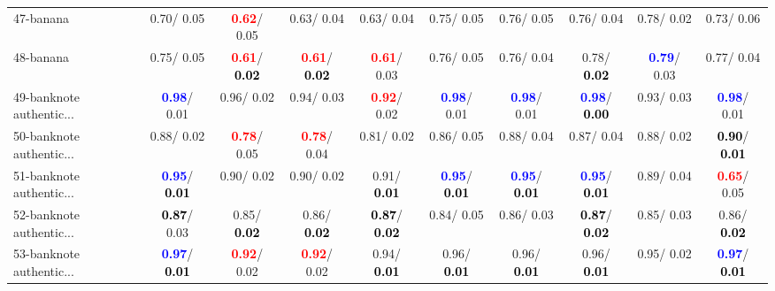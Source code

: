 \begin{table}[h]
\begin{center}
{\begin{tabular}{lc|c|c|c|c|c|c|c|c}
47-banana &   0.70/  0.05 & \textcolor{red}{\textbf{  0.62}}/  0.05 &   0.63/  0.04 &   0.63/  0.04 &   0.75/  0.05 &   0.76/  0.05 &   0.76/  0.04 &   0.78/  0.02 &   0.73/  0.06 \\
48-banana &   0.75/  0.05 & \textcolor{red}{\textbf{  0.61}}/\textcolor{black}{\textbf{  0.02}} & \textcolor{red}{\textbf{  0.61}}/\textcolor{black}{\textbf{  0.02}} & \textcolor{red}{\textbf{  0.61}}/  0.03 &   0.76/  0.05 &   0.76/  0.04 &   0.78/\textcolor{black}{\textbf{  0.02}} & \textcolor{blue}{\textbf{  0.79}}/  0.03 &   0.77/  0.04 \\
49-banknote authentic... & \textcolor{blue}{\textbf{  0.98}}/  0.01 &   0.96/  0.02 &   0.94/  0.03 & \textcolor{red}{\textbf{  0.92}}/  0.02 & \textcolor{blue}{\textbf{  0.98}}/  0.01 & \textcolor{blue}{\textbf{  0.98}}/  0.01 & \textcolor{blue}{\textbf{  0.98}}/\textcolor{black}{\textbf{  0.00}} &   0.93/  0.03 & \textcolor{blue}{\textbf{  0.98}}/  0.01 \\
50-banknote authentic... &   0.88/  0.02 & \textcolor{red}{\textbf{  0.78}}/  0.05 & \textcolor{red}{\textbf{  0.78}}/  0.04 &   0.81/  0.02 &   0.86/  0.05 &   0.88/  0.04 &   0.87/  0.04 &   0.88/  0.02 & \textcolor{black}{\textbf{  0.90}}/\textcolor{black}{\textbf{  0.01}} \\
51-banknote authentic... & \textcolor{blue}{\textbf{  0.95}}/\textcolor{black}{\textbf{  0.01}} &   0.90/  0.02 &   0.90/  0.02 &   0.91/\textcolor{black}{\textbf{  0.01}} & \textcolor{blue}{\textbf{  0.95}}/\textcolor{black}{\textbf{  0.01}} & \textcolor{blue}{\textbf{  0.95}}/\textcolor{black}{\textbf{  0.01}} & \textcolor{blue}{\textbf{  0.95}}/\textcolor{black}{\textbf{  0.01}} &   0.89/  0.04 & \textcolor{red}{\textbf{  0.65}}/  0.05 \\
52-banknote authentic... & \textcolor{black}{\textbf{  0.87}}/  0.03 &   0.85/\textcolor{black}{\textbf{  0.02}} &   0.86/\textcolor{black}{\textbf{  0.02}} & \textcolor{black}{\textbf{  0.87}}/\textcolor{black}{\textbf{  0.02}} &   0.84/  0.05 &   0.86/  0.03 & \textcolor{black}{\textbf{  0.87}}/\textcolor{black}{\textbf{  0.02}} &   0.85/  0.03 &   0.86/\textcolor{black}{\textbf{  0.02}} \\
53-banknote authentic... & \textcolor{blue}{\textbf{  0.97}}/\textcolor{black}{\textbf{  0.01}} & \textcolor{red}{\textbf{  0.92}}/  0.02 & \textcolor{red}{\textbf{  0.92}}/  0.02 &   0.94/\textcolor{black}{\textbf{  0.01}} &   0.96/\textcolor{black}{\textbf{  0.01}} &   0.96/\textcolor{black}{\textbf{  0.01}} &   0.96/\textcolor{black}{\textbf{  0.01}} &   0.95/  0.02 & \textcolor{blue}{\textbf{  0.97}}/\textcolor{black}{\textbf{  0.01}} \\ \hline

\end{tabular}}
\end{center}
\end{table}
